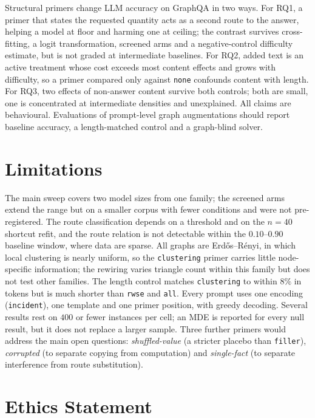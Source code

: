 \documentclass[11pt]{article}
\begin{document}
Structural primers change LLM accuracy on GraphQA in two ways. For RQ1, a
primer that states the requested quantity acts as a second route to the
answer, helping a model at floor and harming one at ceiling; the contrast
survives cross-fitting, a logit transformation, screened arms and a
negative-control difficulty estimate, but is not graded
at intermediate baselines. For RQ2, added text is an active treatment whose
cost exceeds most content effects and grows with difficulty, so a primer
compared only against \texttt{none} confounds content with length. For
RQ3, two effects of non-answer content survive both controls; both are small, one is concentrated
at intermediate densities and unexplained. All claims are behavioural.
Evaluations of prompt-level graph augmentations should report baseline
accuracy, a length-matched control and a graph-blind solver.

\section*{Limitations}
\label{sec:limitations}

The main sweep covers two model sizes from one family; the screened arms
extend the range but on a smaller corpus with fewer conditions and were not
pre-registered. The route classification depends on a threshold and on the
$n{=}40$ shortcut refit, and the route relation is not detectable within
the $0.10$--$0.90$ baseline window, where data are sparse. All graphs are
Erd\H{o}s--R\'enyi, in which local clustering is nearly uniform, so the
\texttt{clustering} primer carries little node-specific information; the
rewiring varies triangle count within this family but does not test other
families. The length control matches \texttt{clustering} to within $8\%$ in
tokens but is much shorter than \texttt{rwse} and \texttt{all}. Every prompt
uses one encoding (\texttt{incident}), one template and one primer
position, with greedy decoding. Several results rest on $400$ or fewer
instances per cell; an MDE is reported for every null result, but it does
not replace a larger sample. Three further primers would address the main
open questions: \emph{shuffled-value} (a stricter placebo than
\texttt{filler}), \emph{corrupted} (to separate copying from computation)
and \emph{single-fact} (to separate interference from route substitution).

\section*{Ethics Statement}
\end{document}
